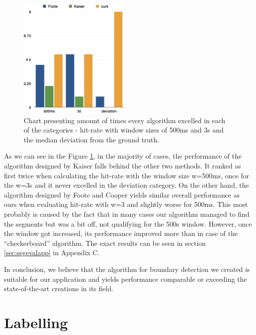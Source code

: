 \begin{figure}
\vspace{-30pt}
  \begin{center}
    \includegraphics[width=0.48\textwidth]{Figures/structurechamps}
  \end{center}
  \caption{Chart presenting amount of times every algorithm excelled in each of the categories - hit-rate with window sizes of 500ms and 3s and the median deviation from the ground truth.}
\label{fig:structurechamps}
\end{figure}

As we can see in the Figure \ref{fig:structurechamps}, in the majority of cases, the performance of the algorithm designed by Kaiser falls behind the other two methods. It ranked as first twice when calculating the hit-rate with the window size w=500ms, once for the w=3s and it never excelled in the deviation category. On the other hand, the algorithm designed by Foote and Cooper yields similar overall performance as ours when evaluating hit-rate with w=3 and slightly worse for 500ms. This most probably is caused by the fact that in many cases our algorithm managed to find the segments but was a bit off, not qualifying for the 500s window. However, once the window got increased, its performance improved more than in case of the ``checkerboard'' algorithm. The exact results can be seen in section \ref{sec:segevalapp} in Appendix C. 

In conclusion, we believe that the algorithm for boundary detection we created is suitable for our application and yields performance comparable or exceeding the state-of-the-art creations in its field. 

\section{Labelling}


